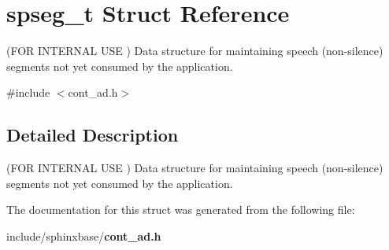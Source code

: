 \section{spseg\-\_\-t \-Struct \-Reference}
\label{structspseg__t}


(\-F\-O\-R \-I\-N\-T\-E\-R\-N\-A\-L \-U\-S\-E ) \-Data structure for maintaining speech (non-\/silence) segments not yet consumed by the application.  




{\ttfamily \#include $<$cont\-\_\-ad.\-h$>$}



\subsection{\-Detailed \-Description}
(\-F\-O\-R \-I\-N\-T\-E\-R\-N\-A\-L \-U\-S\-E ) \-Data structure for maintaining speech (non-\/silence) segments not yet consumed by the application. 

\-The documentation for this struct was generated from the following file\-:\begin{DoxyCompactItemize}
\item 
include/sphinxbase/{\bf cont\-\_\-ad.\-h}\end{DoxyCompactItemize}

